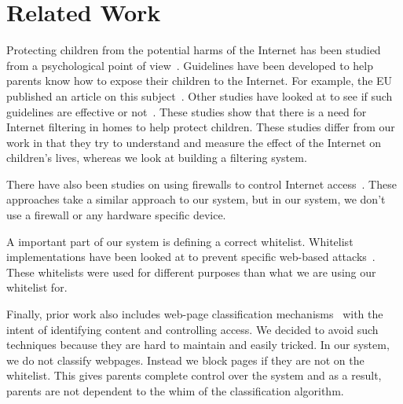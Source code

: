 
\section{Related Work}

Protecting children from the potential harms of the Internet has been studied
from a psychological point of view~\cite{ybarra2005exposure, ho_statistical}.
Guidelines have been developed to help parents know how to expose their
children to the Internet. For example, the EU published an article on this
subject~\cite{holloway2013zero, livingstone2010risks}. Other studies have
looked at to see if such guidelines are effective or
not~\cite{livingstone2008parental}. These studies show that there is a need for
Internet filtering in homes to help protect children. These studies differ from
our work in that they try to understand and measure the effect of the Internet
on children's lives, whereas we look at building a filtering system.

There have also been studies on using firewalls to control Internet
access~\cite{Ivanovic , nguyen}. These approaches take a similar approach to
our system, but in our system, we don't use a firewall or any hardware specific
device.

A important part of our system is defining a correct whitelist. Whitelist
implementations have been looked at to prevent specific web-based
attacks~\cite{han_automated_whitelist, iha_implementation}. These whitelists
were used for different purposes than what we are using our whitelist for.

Finally, prior work also includes web-page classification
mechanisms~\cite{baykan_et_al_url_based_classification,
chen_et_al_novel_web_page_filtering, ho_statistical} with the intent of
identifying content and controlling access. We decided to avoid such techniques
because they are hard to maintain and easily tricked. In our system, we do not
classify webpages. Instead we block pages if they are not on the whitelist.
This gives parents complete control over the system and as a result, parents
are not dependent to the whim of the classification algorithm.
